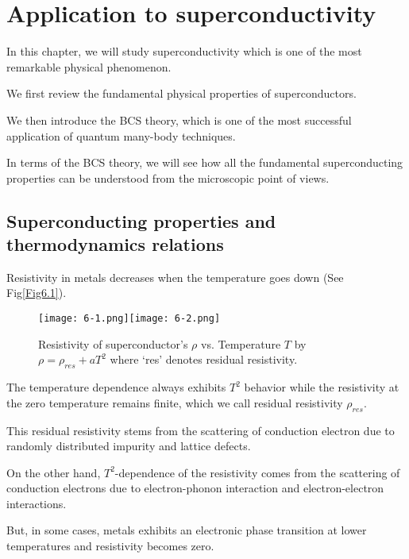 

\chapter{Application to superconductivity}


In this chapter, we will study superconductivity which is one of the most remarkable physical phenomenon.

We first review the fundamental physical properties of superconductors.

We then introduce the BCS theory, which is one of the most successful application of quantum many-body techniques.

In terms of the BCS theory, we will see how all the fundamental superconducting properties can be understood from the microscopic point of views.



\section{Superconducting properties and thermodynamics relations}


Resistivity in metals decreases when the temperature goes down (See Fig{\ref{Fig6.1}}).

\begin{figure}
\begin{center}
\texttt{[image: 6-1.png]}\label{Fig6.1}\texttt{[image: 6-2.png]}\label{Fig6.2}
\caption{Resistivity $\rho$ vs. Temperature $T$ by $\rho = \rho_{res} + aT^2$ where `res' denotes residual resistivity. } \caption{Resistivity of superconductor's $\rho$ vs. Temperature $T$ by $\rho = \rho_{res} + aT^2$ where `res' denotes residual resistivity. } 
\end{center}
\end{figure}
The temperature dependence always exhibits $T^2$ behavior while the resistivity at the zero temperature remains finite, which we call residual resistivity $\rho_{res}$.
    
This residual resistivity stems from the scattering of conduction electron due to randomly distributed impurity and lattice defects. 
    
On the other hand, $T^2$-dependence of the resistivity comes from the scattering of conduction electrons due to electron-phonon interaction and electron-electron interactions. 
    
But, in some cases, metals exhibits an electronic phase transition at lower temperatures and resistivity becomes zero. 


